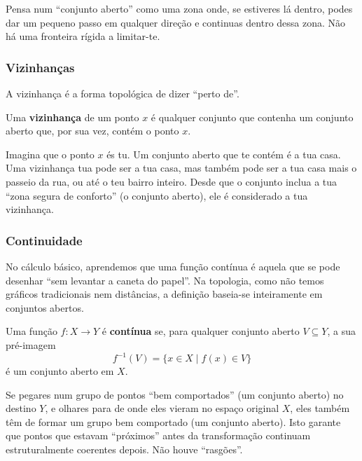 \begin{notebox}[title={Intuição: Conjunto Aberto}]
  Pensa num ``conjunto aberto'' como uma zona onde, se estiveres lá dentro, podes dar um pequeno passo em qualquer direção e continuas dentro dessa zona. Não há uma fronteira rígida a limitar-te.
\end{notebox}

\subsubsection*{Vizinhanças}

A vizinhança é a forma topológica de dizer ``perto de''.

\begin{defbox}[title={Vizinhança}]
  Uma \textbf{vizinhança} de um ponto $x$ é qualquer conjunto que contenha um conjunto aberto que, por sua vez, contém o ponto $x$.
\end{defbox}

\begin{notebox}[title={Intuição: Vizinhança}]
  Imagina que o ponto $x$ és tu. Um conjunto aberto que te contém é a tua casa. Uma vizinhança tua pode ser a tua casa, mas também pode ser a tua casa mais o passeio da rua, ou até o teu bairro inteiro. Desde que o conjunto inclua a tua ``zona segura de conforto'' (o conjunto aberto), ele é considerado a tua vizinhança.
\end{notebox}

\subsubsection*{Continuidade}

No cálculo básico, aprendemos que uma função contínua é aquela que se pode desenhar ``sem levantar a caneta do papel''. Na topologia, como não temos gráficos tradicionais nem distâncias, a definição baseia-se inteiramente em conjuntos abertos.

\begin{defbox}[title={Função Contínua}]
  Uma função $f: X \to Y$ é \textbf{contínua} se, para qualquer conjunto aberto $V \subseteq Y$, a sua pré-imagem
  \[
    f^{-1}(V) = \{ x \in X \mid f(x) \in V \}
  \]
  é um conjunto aberto em $X$.
\end{defbox}

\begin{notebox}[title={Intuição: Continuidade}]
  Se pegares num grupo de pontos ``bem comportados'' (um conjunto aberto) no destino $Y$, e olhares para de onde eles vieram no espaço original $X$, eles também têm de formar um grupo bem comportado (um conjunto aberto). Isto garante que pontos que estavam ``próximos'' antes da transformação continuam estruturalmente coerentes depois. Não houve ``rasgões''.
\end{notebox}

